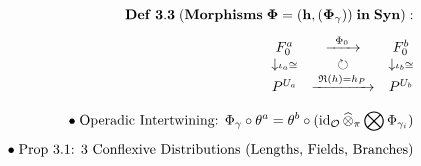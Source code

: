 \documentclass[preview]{standalone}
\begin{document}
\begin{align*}
\special{dvisvgm:raw <g id='unique000'>}\mathbf{Def\;3.3\;(Morphisms\;\Phi=(h,(\Phi_\gamma))\;in\;\mathbf{Syn}):}\\[4pt]\begin{matrix} F_0^a & \xrightarrow{\;\;\Phi_0\;\;} & F_0^b \\ \downarrow\scriptstyle\iota_a\cong & \circlearrowright & \downarrow\scriptstyle\iota_b\cong \\ P^{U_a} & \xrightarrow{\;\mathfrak{R}(h)=h_P\;} & P^{U_b} \end{matrix}\\[6pt]\bullet\;\text{Operadic Intertwining: }\Phi_\gamma \circ \theta^a = \theta^b \circ (\operatorname{id}_{\mathcal{O}}\widehat{\otimes}_\pi\bigotimes\Phi_{\gamma_i})\\[3pt]\bullet\;\text{Prop 3.1: }3\text{ Conflexive Distributions (Lengths, Fields, Branches)}\special{dvisvgm:raw </g>}
\end{align*}
\end{document}
